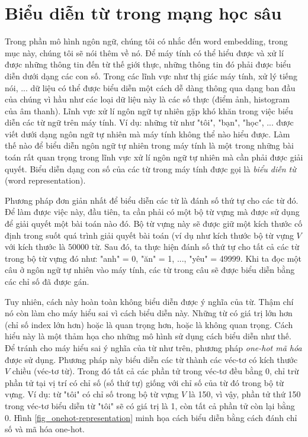 \section{Biểu diễn từ trong mạng học sâu} \label{wordembeddingsection}
Trong phần mô hình ngôn ngữ, chúng tôi có nhắc đến word embedding, trong mục này, chúng tôi sẽ nói thêm về nó. Để máy tính có thể hiểu được và xử lí được những thông tin đến từ thế giới thực, những thông tin đó phải được biểu diễn dưới dạng các con số. Trong các lĩnh vực như thị giác máy tính, xử lý tiếng nói, ... dữ liệu có thể được biểu diễn một cách dễ dàng thông qua dạng ban đầu của chúng vì hầu như các loại dữ liệu này là các số thực (điểm ảnh, histogram của âm thanh). Lĩnh vực xử lí ngôn ngữ tự nhiên gặp khó khăn trong việc biểu diễn các từ ngữ trên máy tính. Ví dụ: những từ như "tôi", "bạn", "học", ... được viết dưới dạng ngôn ngữ tự nhiên mà máy tính không thể nào hiểu được. Làm thế nào để biểu diễn ngôn ngữ tự nhiên trong máy tính là một trong những bài toán rất quan trọng trong lĩnh vực xử lí ngôn ngữ tự nhiên mà cần phải được giải quyết. Biểu diễn dạng con số của các từ trong máy tính được gọi là \textit{biểu diễn từ} (word representation).

Phương pháp đơn giản nhất để biểu diễn các từ là đánh số thứ tự cho các từ đó. Để làm được việc này, đầu tiên, ta cần phải có một bộ từ vựng mà được sử dụng để giải quyết một bài toán nào đó. Bộ từ vựng này sẽ được giữ một kích thước cố định trong suốt quá trình giải quyết bài toán (ví dụ như kích thước bộ từ vựng $V$ với kích thước là $50000$ từ. Sau đó, ta thực hiện đánh số thứ tự cho tất cả các từ trong bộ từ vựng đó như: "anh" = 0, "ăn" = 1, ..., "yêu" = 49999. Khi ta đọc một câu ở ngôn ngữ tự nhiên vào máy tính, các từ trong câu sẽ được biểu diễn bằng các chỉ số đã được gán.

Tuy nhiên, cách này hoàn toàn không biểu diễn được ý nghĩa của từ. Thậm chí nó còn làm cho máy hiểu sai vì cách biểu diễn này. Những từ có giá trị lớn hơn (chỉ số index lớn hơn) hoặc là quan trọng hơn, hoặc là không quan trọng. Cách hiểu này là một thảm họa cho những mô hình sử dụng cách biểu diễn như thế. Để tránh cho máy hiểu sai ý nghĩa của từ như trên, phương pháp \textit{one-hot mã hóa} được sử dụng. Phương pháp này biểu diễn các từ thành các véc-tơ có kích thước $V$ chiều (véc-tơ từ). Trong đó tất cả các phần tử trong véc-tơ đều bằng 0, chỉ trừ phần tử tại vị trí có chỉ số (số thứ tự) giống với chỉ số của từ đó trong bộ từ vựng. Ví dụ: từ "tôi" có chỉ số trong bộ từ vựng $V$ là 150, vì vậy, phần tử thứ 150 trong véc-tơ biểu diễn từ "tôi" sẽ có giá trị là 1, còn tất cả phần tử còn lại bằng 0. Hình \ref{fig_onehot-representation} minh họa cách biểu diễn bằng cách đánh chỉ số và mã hóa one-hot.

